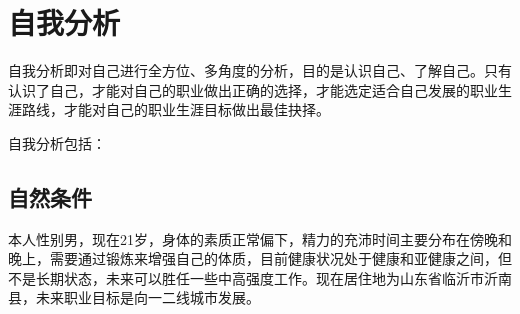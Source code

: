 \documentclass{article}
\begin{document}
\thispagestyle{empty}
\newpage
\setcounter{page}{1}
\section{自我分析}
	自我分析即对自己进行全方位、多角度的分析，目的是认识自己、了解自己。只有认识了自己，才能对自己的职业做出正确的选择，才能选定适合自己发展的职业生涯路线，才能对自己的职业生涯目标做出最佳抉择。\par
	自我分析包括：\par
\subsection{自然条件}
本人性别男，现在21岁，身体的素质正常偏下，精力的充沛时间主要分布在傍晚和晚上，需要通过锻炼来增强自己的体质，目前健康状况处于健康和亚健康之间，但不是长期状态，未来可以胜任一些中高强度工作。现在居住地为山东省临沂市沂南县，未来职业目标是向一二线城市发展。
\par
\end{document}
